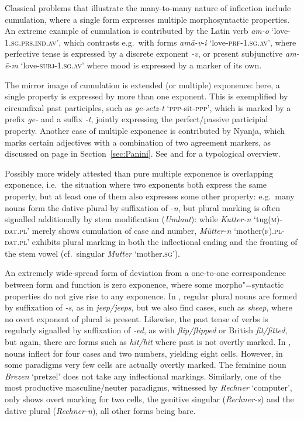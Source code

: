 \documentclass[output=paper,biblatex,babelshorthands,newtxmath,draftmode,colorlinks,citecolor=brown]{langscibook}
\begin{document}
Classical problems that illustrate the many-to-many nature of
inflection include cumulation, where a single form expresses multiple
morphosyntactic properties. An extreme example of cumulation is
contributed by the Latin verb \textit{am-o}
`love-1.\textsc{sg}.\textsc{prs}.\textsc{ind}.\textsc{av}', which
contrasts e.g.\ with forms \textit{amā-v-i}
`love-\textsc{prf}-\textsc{1.sg.av}', where perfective tense is
expressed by a discrete exponent \textit{-v}, or present subjunctive
\textit{am-ē-m} `love-\textsc{subj}-\textsc{1.sg.av}' where mood is
expressed by a marker of its own.

The mirror image of cumulation is extended (or multiple) exponence:
here, a single property is expressed by more than one exponent. This
is exemplified by  circumfixal past participles, such as
\textit{ge-setz-t} `\textsc{ppp}-sit-\textsc{ppp}', which is
 marked by a prefix \textit{ge-} and a suffix \textit{-t},
jointly expressing the perfect/passive participial property. Another
case of multiple exponence is contributed by Nyanja, which marks
certain adjectives with a combination of two agreement markers, as
discussed on page \pageref{Nyanja} in
Section~\ref{sec:Panini}.  See
\citet{caballero_g-harris_a12} and \citet{Harris17} for a typological overview. 

Possibly more widely attested than pure multiple exponence is
overlapping exponence, i.e.\ the situation where two exponents both
express the same property, but at least one of them also expresses
some other property: e.g.\ many  nouns form the dative plural by
suffixation of \textit{-n}, but plural marking is often signalled
additionally by stem modification (\textit{Umlaut}): while
\textit{Kutter-n} `tug(\textsc{m})-\textsc{dat.pl}' merely shows
cumulation of case and number, \textit{Mütter-n}
`mother(\textsc{f}).\textsc{pl}-\textsc{dat.pl}' exhibits plural
marking in both the inflectional ending and the fronting of the stem
vowel (cf.\ singular \textit{Mutter} `mother.\textsc{sg}').

An extremely wide-spread form of deviation from a one-to-one
correspondence between form and function is zero exponence, where some
morpho"=syntactic properties do not give rise to any exponence. In
, regular plural nouns are formed by suffixation of
\textit{-s}, as in \textit{jeep/jeeps}, but we also find cases, such
as \textit{sheep}, where no overt exponent of plural is
present. Likewise, the past tense of  verbs is regularly
signalled by suffixation of \textit{-ed}, as with
\textit{flip/flipped} or British  \textit{fit/fitted}, but
again, there are forms such as \textit{hit/hit} where past is not
overtly marked.  In , nouns inflect for four cases and two
numbers, yielding eight cells. However, in some paradigms very few
cells are actually overtly marked. The feminine noun \textit{Brezen}
`pretzel' does not take any inflectional markings. Similarly, one of
the most productive masculine/neuter paradigms, witnessed by
\textit{Rechner} `computer', only shows overt marking for two cells,
the genitive singular (\textit{Rechner-s}) and the dative plural
(\textit{Rechner-n}), all other forms being bare.
\end{document}
